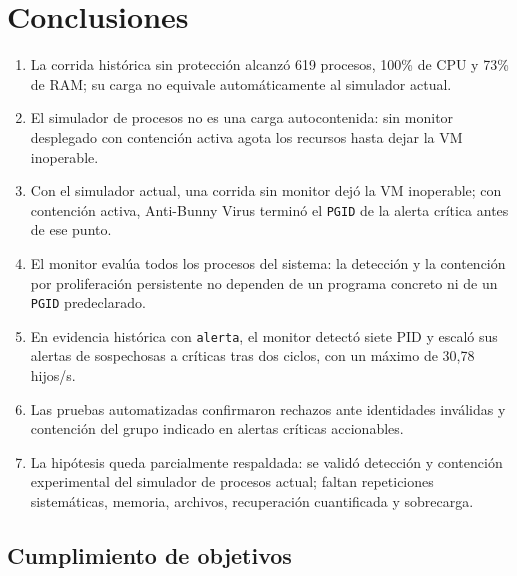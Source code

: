 \chapter{Conclusiones}

\begin{enumerate}
  \item La corrida histórica sin protección alcanzó 619 procesos, 100\% de CPU
        y 73\% de RAM; su carga no equivale automáticamente al simulador actual.
  \item El simulador de procesos no es una carga autocontenida: sin monitor
        desplegado con contención activa agota los recursos hasta dejar la VM
        inoperable.
  \item Con el simulador actual, una corrida sin monitor dejó la VM inoperable;
        con contención activa, Anti-Bunny Virus terminó el \texttt{PGID} de la
        alerta crítica antes de ese punto.
  \item El monitor evalúa todos los procesos del sistema: la detección y la
        contención por proliferación persistente no dependen de un programa
        concreto ni de un \texttt{PGID} predeclarado.
  \item En evidencia histórica con \texttt{alerta}, el monitor detectó siete PID y escaló
        sus alertas de sospechosas a críticas tras dos ciclos, con un máximo de
        30,78 hijos/s.
  \item Las pruebas automatizadas confirmaron rechazos ante identidades inválidas
        y contención del grupo indicado en alertas críticas accionables.
  \item La hipótesis queda parcialmente respaldada: se validó detección y
        contención experimental del simulador de procesos actual; faltan
        repeticiones sistemáticas, memoria, archivos, recuperación cuantificada
        y sobrecarga.
\end{enumerate}

\section{Cumplimiento de objetivos}

